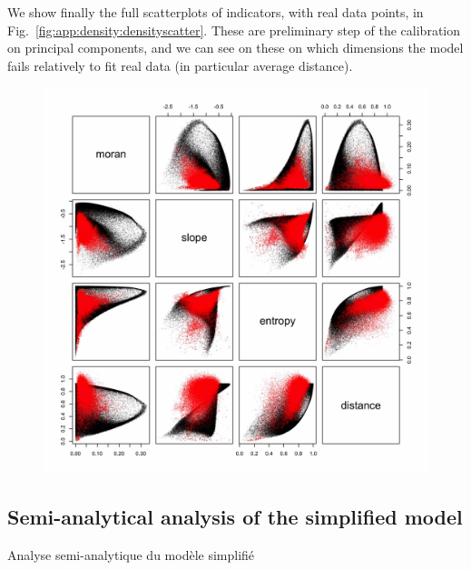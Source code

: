 
We show finally the full scatterplots of indicators, with real data points, in Fig.~\ref{fig:app:density:densityscatter}. These are preliminary step of the calibration on principal components, and we can see on these on which dimensions the model fails relatively to fit real data (in particular average distance).


\begin{figure}
\includegraphics[width=\linewidth]{Figures/Final/A-density-densityscatter}
\end{figure}





\subsection{Semi-analytical analysis of the simplified model}{Analyse semi-analytique du modèle simplifié}


